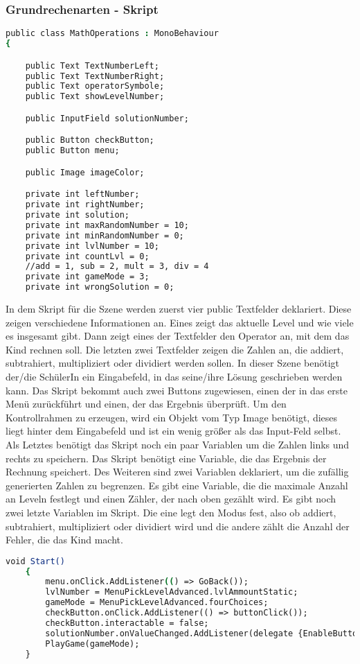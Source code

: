 \subsubsection{Grundrechenarten - Skript}
\begin{lstlisting}[language=csh, caption={MathOperations.cs Variablen-Deklaration}]
public class MathOperations : MonoBehaviour
{

	public Text TextNumberLeft;
	public Text TextNumberRight;
	public Text operatorSymbole;
	public Text showLevelNumber;

	public InputField solutionNumber;

	public Button checkButton;
	public Button menu;

	public Image imageColor;

	private int leftNumber;
	private int rightNumber;
	private int solution;
	private int maxRandomNumber = 10;
	private int minRandomNumber = 0;
	private int lvlNumber = 10;
	private int countLvl = 0;
	//add = 1, sub = 2, mult = 3, div = 4
	private int gameMode = 3;
	private int wrongSolution = 0;
\end{lstlisting}
In dem Skript für die Szene werden zuerst vier public Textfelder deklariert. Diese zeigen verschiedene Informationen an. Eines zeigt das aktuelle Level und wie viele es insgesamt gibt. Dann zeigt eines der Textfelder den Operator an, mit dem das Kind rechnen soll. Die letzten zwei Textfelder zeigen die Zahlen an, die addiert, subtrahiert, multipliziert oder dividiert werden sollen. In dieser Szene benötigt der/die SchülerIn ein Eingabefeld, in das seine/ihre Lösung geschrieben werden kann. Das Skript bekommt auch zwei Buttons zugewiesen, einen der in das erste Menü zurückführt und einen, der das Ergebnis überprüft. Um den Kontrollrahmen zu erzeugen, wird ein Objekt vom Typ Image benötigt, dieses liegt hinter dem Eingabefeld und ist ein wenig größer als das Input-Feld selbst. Als Letztes benötigt das Skript noch ein paar Variablen um die Zahlen links und rechts zu speichern. Das Skript benötigt eine Variable, die das Ergebnis der Rechnung speichert. Des Weiteren sind zwei Variablen deklariert, um die zufällig generierten Zahlen zu begrenzen. Es gibt eine Variable, die die maximale Anzahl an Leveln festlegt und einen Zähler, der nach oben gezählt wird. Es gibt noch zwei letzte Variablen im Skript. Die eine legt den Modus fest, also ob addiert, subtrahiert, multipliziert oder dividiert wird und die andere zählt die Anzahl der Fehler, die das Kind macht.\\
\begin{lstlisting}[language=csh, caption={MathOperations.cs Start-Funktion}]
	void Start()
	{
		menu.onClick.AddListener(() => GoBack());
		lvlNumber = MenuPickLevelAdvanced.lvlAmmountStatic;
		gameMode = MenuPickLevelAdvanced.fourChoices;
		checkButton.onClick.AddListener(() => buttonClick());
		checkButton.interactable = false;
		solutionNumber.onValueChanged.AddListener(delegate {EnableButton(); });
		PlayGame(gameMode);
	}
\end{lstlisting}
